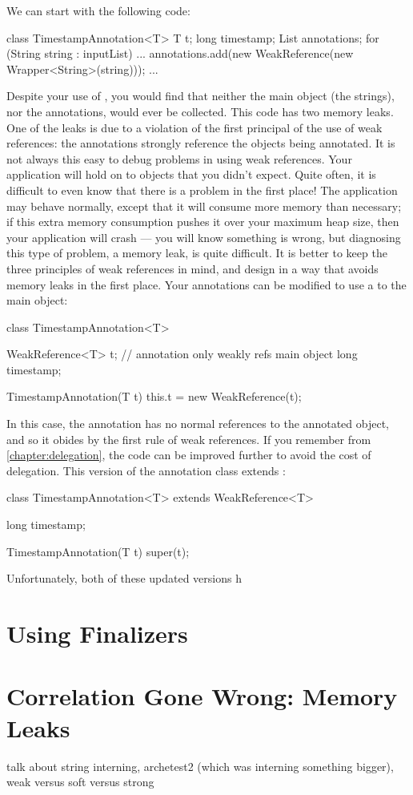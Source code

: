 We can start with the following code:

\begin{shortlisting}
class TimestampAnnotation<T> {
	T t;
	long timestamp;
}
List annotations;
for (String string : inputList) {
	...
	annotations.add(new WeakReference(new Wrapper<String>(string)));
	...
}
\end{shortlisting}

Despite your use of , you would find that neither the main
object (the strings), nor the annotations, would ever be collected. This code
has two memory leaks. One of the leaks is due to a
violation of the first principal of the use of weak references: the annotations
strongly reference the objects being annotated. It is not always this easy to
debug problems in using weak references. Your application will hold on to objects
that you didn't expect. Quite often, it is difficult to even know that there is a
problem in the first place! The application may behave normally, except that it
will consume more memory than necessary; if this extra memory consumption pushes
it over your maximum heap size, then your application will crash --- you will
know something is wrong, but diagnosing this type of problem, a memory
leak, is quite difficult. It is better to keep the
three principles of weak references in mind, and design in a way that avoids
memory leaks in the first place. Your annotations can be modified to use a
 to the main object:

\begin{shortlisting}
class TimestampAnnotation<T> {
	WeakReference<T> t; // annotation only weakly refs main object
	long timestamp;
	
	TimestampAnnotation(T t) {
		this.t = new WeakReference(t);
	}
}
\end{shortlisting}

In this case, the annotation has no normal references to the annotated object,
and so it obides by the first rule of weak references. If you remember from
\autoref{chapter:delegation}, the code can be improved further to avoid the cost
of delegation. This version of the annotation class extends
:

\begin{shortlisting}
class TimestampAnnotation<T> extends WeakReference<T> {
	long timestamp;
	
	TimestampAnnotation(T t) {
		super(t);
	}
}
\end{shortlisting}

Unfortunately, both of these updated versions h



\section{Using Finalizers}


\section{Correlation Gone Wrong: Memory Leaks}


talk about string interning, archetest2 (which was interning something bigger),
weak versus soft versus strong
